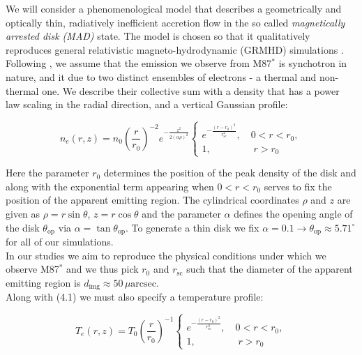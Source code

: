 \documentclass[12pt]{article}
\numberwithin{equation}{section}
\numberwithin{figure}{section}
\begin{document}
	We will consider a phenomenological model that describes a geometrically and optically thin, radiatively inefficient accretion flow in the so called \emph{magnetically arrested disk (MAD)} state. The model is chosen so that it qualitatively reproduces general relativistic magneto-hydrodynamic (GRMHD) simulations \cite{Yuan2003}. Following \cite{Gold2020}, \cite{Broderick2021} we assume that the emission we observe from M87$^*$ is synchotron in nature, and it due to two distinct ensembles of electrons - a thermal and non-thermal one. We describe their collective sum with a density that has a power law scaling in the radial direction, and a vertical Gaussian profile:
	
	\begin{equation}
		n_e(r,z) = n_0\left(\frac{r}{r_0}\right)^{-2}e^{-\frac{z^2}{2(\alpha\rho)^2}}
		\begin{cases}
			e^{-\frac{(r-r_0)^2}{r^2_{\text{sc}}}},\quad 0 < r < r_0,\\
			1,\,\,\qquad\qquad r>r_0
		\end{cases}
	\end{equation}
	
	Here the parameter $r_0$ determines the position of the peak density of the disk and along with the exponential term appearing when $0 < r < r_0$ serves to fix the position of the apparent emitting region. The cylindrical coordinates $\rho$ and $z$ are given as $\rho = r\sin\theta$, $z = r\cos\theta$ and the parameter $\alpha$ defines the opening angle of the disk $\theta_{\text{op}}$ via $\alpha = \tan\theta_\text{op}$. To generate a thin disk we fix 
	$\alpha = 0.1 \rightarrow \theta_{\text{op}}\approx 5.71^\circ$  for all of our simulations.\\
	In our studies we aim to reproduce the physical conditions under which we observe M87$^*$ and we thus pick $r_0$ and $r_\text{sc}$ such that the diameter of the apparent emitting region is $d_\text{img}\approx 50\, \mu\text{arcsec}$.\\
	
	Along with (4.1) we must also specify a temperature profile:
	
	\begin{equation}
		T_e(r,z) = T_0\left(\frac{r}{r_0}\right)^{-1}
		\begin{cases}
			e^{-\frac{(r-r_0)^2}{r^2_{\text{sc}}}},\quad 0 < r < r_0,\\
			1,\,\,\qquad\qquad r>r_0
		\end{cases}
	\end{equation}
	
\end{document}
